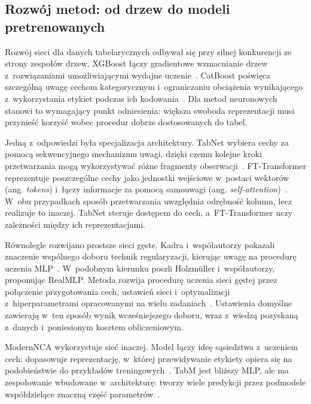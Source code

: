 \subsection{Rozwój metod: od drzew do modeli pretrenowanych}
\label{sec:rozwoj-podejsc}

Rozwój sieci dla danych tabelarycznych odbywał się przy silnej konkurencji ze strony zespołów drzew. XGBoost łączy gradientowe wzmacnianie drzew z~rozwiązaniami umożliwiającymi wydajne uczenie~\cite{chen2016xgboost}. CatBoost poświęca szczególną uwagę cechom kategorycznym i~ograniczaniu obciążenia wynikającego z~wykorzystania etykiet podczas ich kodowania~\cite{prokhorenkova2018catboost}. Dla metod neuronowych stanowi to wymagający punkt odniesienia: większa swoboda reprezentacji musi przynieść korzyść wobec procedur dobrze dostosowanych do tabel.

Jedną z~odpowiedzi była specjalizacja architektury. TabNet wybiera cechy za pomocą sekwencyjnego mechanizmu uwagi, dzięki czemu kolejne kroki przetwarzania mogą wykorzystywać różne fragmenty obserwacji~\cite{arik2021tabnet}. FT-Transformer reprezentuje poszczególne cechy jako jednostki wejściowe w~postaci wektorów (ang. \textit{tokens}) i~łączy informacje za pomocą samouwagi (ang. \textit{self-attention})~\cite{gorishniy2021revisiting}. W~obu przypadkach sposób przetwarzania uwzględnia odrębność kolumn, lecz realizuje to inaczej. TabNet steruje dostępem do cech, a~FT-Transformer uczy zależności między ich reprezentacjami.

Równolegle rozwijano prostsze sieci gęste. Kadra i~współautorzy pokazali znaczenie wspólnego doboru technik regularyzacji, kierując uwagę na procedurę uczenia MLP~\cite{kadra2021regularization}. W~podobnym kierunku poszli Holzmüller i~współautorzy, proponując RealMLP. Metoda rozwija procedurę uczenia sieci gęstej przez połączenie przygotowania cech, ustawień sieci i~optymalizacji z~hiperparametrami opracowanymi na wielu zadaniach~\cite{holzmueller2024realmlp}. Ustawienia domyślne zawierają w~ten sposób wynik wcześniejszego doboru, wraz z~wiedzą pozyskaną z~danych i~poniesionym kosztem obliczeniowym.

ModernNCA wykorzystuje sieć inaczej. Model łączy ideę sąsiedztwa z~uczeniem cech: dopasowuje reprezentację, w~której przewidywanie etykiety opiera się na podobieństwie do przykładów treningowych~\cite{ye2025modernnca}. TabM jest bliższy MLP, ale ma zespołowanie wbudowane w~architekturę: tworzy wiele predykcji przez podmodele współdzielące znaczną część parametrów~\cite{gorishniy2025tabm}.

